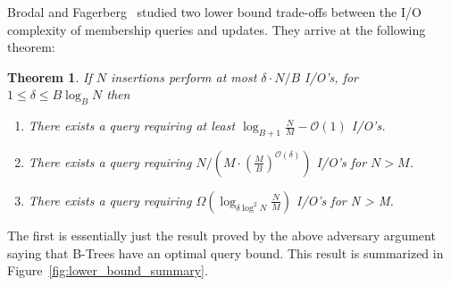 \documentclass[twoside,11pt,openright]{report}
\newtheorem{theorem}{Theorem}
\begin{document}
Brodal and Fagerberg~\cite{Brodal:2003:LBE:644108.644201} studied two lower bound trade-offs between the I/O complexity of membership queries and updates. They arrive at the following theorem:
\begin{theorem}
If $N$ insertions perform at most $\delta \cdot N/B$ I/O's, for $1 \leq \delta \leq B \log_B N$ then
\begin{enumerate}
	\item There exists a query requiring at least $\log_{B+1} \frac{N}{M} - \mathcal{O}(1)$ I/O's.
	\item There exists a query requiring $N/(M\cdot (\frac{M}{B})^{\mathcal{O}(\delta)})$ I/O's for $N > M$.
	\item There exists a query requiring $\Omega(\log_{\delta \log^2 N} \frac{N}{M})$ I/O's for N > M.
\end{enumerate}
\end{theorem}

The first is essentially just the result proved by the above adversary argument saying that B-Trees have an optimal query bound. This result is summarized in Figure~\ref{fig:lower_bound_summary}.
\end{document}
